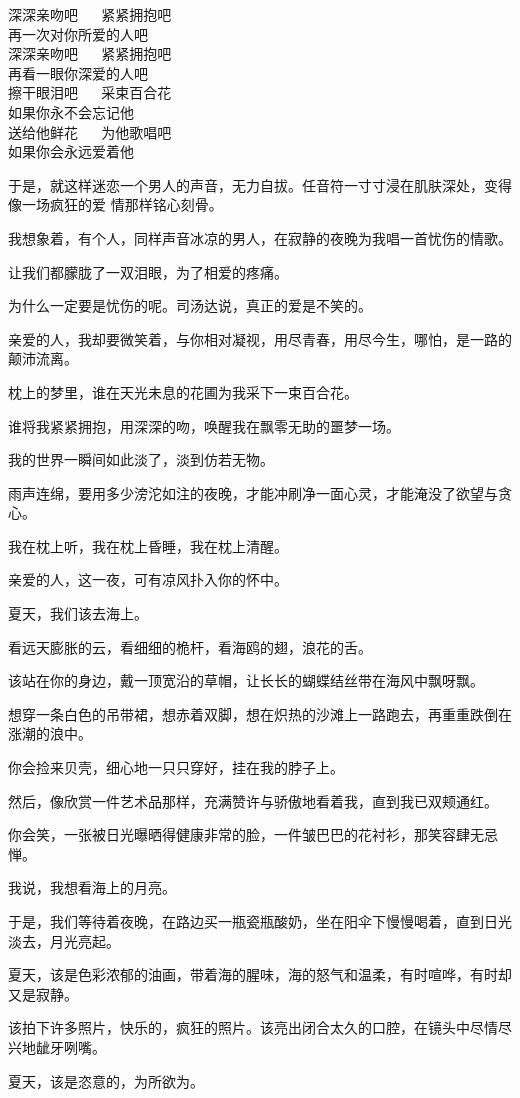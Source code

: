 		\longpoem{}{}{}
			深深亲吻吧 ~~ 紧紧拥抱吧 \\
			再一次对你所爱的人吧 \\
			深深亲吻吧 ~~ 紧紧拥抱吧 \\
			再看一眼你深爱的人吧 \\
			擦干眼泪吧  ~~ 采束百合花 \\
			如果你永不会忘记他 \\
			送给他鲜花 ~~ 为他歌唱吧 \\
			如果你会永远爱着他
		\endlongpoem

		于是，就这样迷恋一个男人的声音，无力自拔。任音符一寸寸浸在肌肤深处，变得像一场疯狂的爱
	情那样铭心刻骨。

		我想象着，有个人，同样声音冰凉的男人，在寂静的夜晚为我唱一首忧伤的情歌。\par
		让我们都朦胧了一双泪眼，为了相爱的疼痛。\par
		为什么一定要是忧伤的呢。司汤达说，真正的爱是不笑的。\par
		亲爱的人，我却要微笑着，与你相对凝视，用尽青春，用尽今生，哪怕，是一路的颠沛流离。\par
		枕上的梦里，谁在天光未息的花圃为我采下一束百合花。\par
		谁将我紧紧拥抱，用深深的吻，唤醒我在飘零无助的噩梦一场。\par
		我的世界一瞬间如此淡了，淡到仿若无物。\par
		雨声连绵，要用多少滂沱如注的夜晚，才能冲刷净一面心灵，才能淹没了欲望与贪心。\par
		我在枕上听，我在枕上昏睡，我在枕上清醒。

		\vspace{1em}
		亲爱的人，这一夜，可有凉风扑入你的怀中。



		夏天，我们该去海上。

		\vspace{1em}
		看远天膨胀的云，看细细的桅杆，看海鸥的翅，浪花的舌。\par
		该站在你的身边，戴一顶宽沿的草帽，让长长的蝴蝶结丝带在海风中飘呀飘。\par
		想穿一条白色的吊带裙，想赤着双脚，想在炽热的沙滩上一路跑去，再重重跌倒在涨潮的浪中。

		\vspace{1em}
		你会捡来贝壳，细心地一只只穿好，挂在我的脖子上。\par
		然后，像欣赏一件艺术品那样，充满赞许与骄傲地看着我，直到我已双颊通红。\par
		你会笑，一张被日光曝晒得健康非常的脸，一件皱巴巴的花衬衫，那笑容肆无忌惮。\par
		我说，我想看海上的月亮。\par
		于是，我们等待着夜晚，在路边买一瓶瓷瓶酸奶，坐在阳伞下慢慢喝着，直到日光淡去，月光亮起。\par
		夏天，该是色彩浓郁的油画，带着海的腥味，海的怒气和温柔，有时喧哗，有时却又是寂静。\par
		该拍下许多照片，快乐的，疯狂的照片。该亮出闭合太久的口腔，在镜头中尽情尽兴地龇牙咧嘴。\par
		夏天，该是恣意的，为所欲为。

